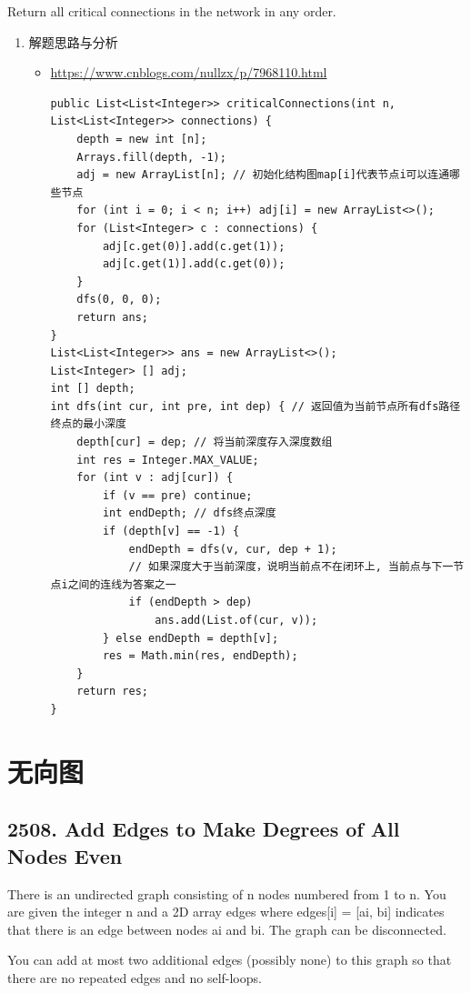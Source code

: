 \documentclass[9pt, b5paaper]{book}
\begin{document}
Return all critical connections in the network in any order.
\begin{enumerate}
\item 解题思路与分析
\label{sec-1-3-2-1}
\begin{itemize}
\item \url{https://www.cnblogs.com/nullzx/p/7968110.html}

\begin{verbatim}
public List<List<Integer>> criticalConnections(int n, List<List<Integer>> connections) {
    depth = new int [n];
    Arrays.fill(depth, -1);
    adj = new ArrayList[n]; // 初始化结构图map[i]代表节点i可以连通哪些节点
    for (int i = 0; i < n; i++) adj[i] = new ArrayList<>();
    for (List<Integer> c : connections) {
        adj[c.get(0)].add(c.get(1));
        adj[c.get(1)].add(c.get(0));
    }
    dfs(0, 0, 0);
    return ans;
}
List<List<Integer>> ans = new ArrayList<>();
List<Integer> [] adj;
int [] depth;
int dfs(int cur, int pre, int dep) { // 返回值为当前节点所有dfs路径终点的最小深度
    depth[cur] = dep; // 将当前深度存入深度数组
    int res = Integer.MAX_VALUE;
    for (int v : adj[cur]) {
        if (v == pre) continue;
        int endDepth; // dfs终点深度
        if (depth[v] == -1) {
            endDepth = dfs(v, cur, dep + 1);
            // 如果深度大于当前深度，说明当前点不在闭环上, 当前点与下一节点i之间的连线为答案之一
            if (endDepth > dep)
                ans.add(List.of(cur, v));
        } else endDepth = depth[v];
        res = Math.min(res, endDepth);
    }
    return res;
}
\end{verbatim}
\end{itemize}
\end{enumerate}

\section{无向图}
\label{sec-1-4}
\subsection{2508. Add Edges to Make Degrees of All Nodes Even}
\label{sec-1-4-1}
There is an undirected graph consisting of n nodes numbered from 1 to n. You are given the integer n and a 2D array edges where edges[i] = [ai, bi] indicates that there is an edge between nodes ai and bi. The graph can be disconnected.

You can add at most two additional edges (possibly none) to this graph so that there are no repeated edges and no self-loops.
\end{document}
